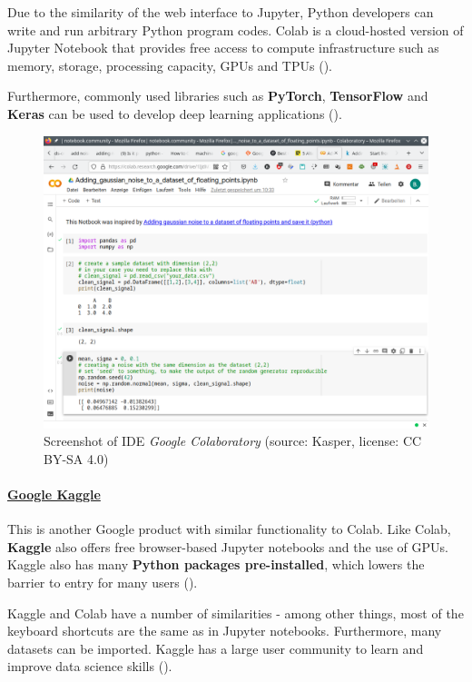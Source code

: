 \documentclass [oneside,10pt,a4paper,ngerman,BCOR10mm,headsepline,parindent,final]{scrartcl}
\begin{document}
Due to the similarity of the web interface to Jupyter, Python developers
can write and run arbitrary Python program codes. Colab is a
cloud-hosted version of Jupyter Notebook that provides free access to
compute infrastructure such as memory, storage, processing capacity,
GPUs and TPUs (\cite{Colab_about_2022}).

Furthermore, commonly used libraries such as \textbf{PyTorch},
\textbf{TensorFlow} and \textbf{Keras} can be used to develop deep
learning applications (\cite{Colab_5_Alternatives_2021}).

\begin{figure}
\centering
\includegraphics{images/Screenshot_google_Colab.png}
\caption{Screenshot of IDE \emph{Google Colaboratory} (source: Kasper,
license: CC BY-SA 4.0)}
\end{figure}

    \hypertarget{google-kaggle}{%
\paragraph{\texorpdfstring{\href{https://www.kaggle.com}{Google
Kaggle}}{Google Kaggle}}\label{google-kaggle}}

This is another Google product with similar functionality to Colab. Like
Colab, \textbf{Kaggle} also offers free browser-based Jupyter notebooks
and the use of GPUs. Kaggle also has many \textbf{Python packages
pre-installed}, which lowers the barrier to entry for many users
(\cite{Colab_Alternatives_2021}).

Kaggle and Colab have a number of similarities - among other things,
most of the keyboard shortcuts are the same as in Jupyter notebooks.
Furthermore, many datasets can be imported. Kaggle has a large user
community to learn and improve data science skills
(\cite{Colab_5_Alternatives_2021}).
\end{document}
